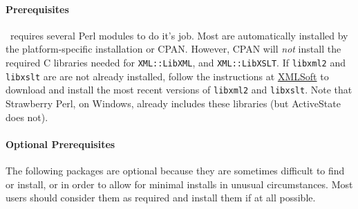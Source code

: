 \documentclass{article}
\begin{document}
\paragraph{Prerequisites}\label{prerequisites}
\LaTeXML\ requires several Perl modules to do it's job.  Most
are automatically installed by the platform-specific installation or CPAN.
However, CPAN will \emph{not} install the required C libraries needed for
\texttt{XML::LibXML}, and \texttt{XML::LibXSLT}.
If \texttt{libxml2} and \texttt{libxslt} are are not already installed,
follow the instructions at \href{http://www.xmlsoft.org}{XMLSoft} to
download and install the most recent versions of \texttt{libxml2} and \texttt{libxslt}.
Note that Strawberry Perl, on Windows, already includes these libraries
(but ActiveState does not).

\paragraph{Optional Prerequisites}
The following packages are optional because they are sometimes difficult
to find or install, or in order to allow for minimal installs in unusual
circumstances.  Most users should consider them as required and install
them if at all possible.
\end{document}
